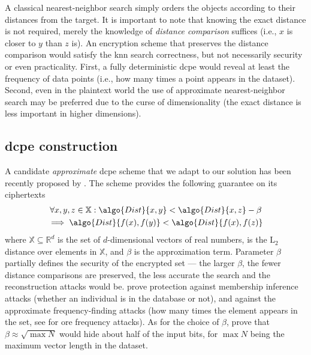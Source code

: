 		A classical nearest-neighbor search \cite{knn-wong,knn-cunningham} simply orders the objects according to their distances from the target.
		It is important to note that knowing the exact distance is not required, merely the knowledge of \emph{distance comparison} suffices (i.e., $x$ is closer to $y$ than $z$ is).
		An encryption scheme that preserves the distance comparison would satisfy the \acrshort{knn} search correctness, but not necessarily security or even practicality.
		First, a fully deterministic \acrfull{dcpe} would reveal at least the frequency of data points (i.e., how many times a point appears in the dataset).
		Second, even in the plaintext world the use of approximate nearest-neighbor search \cite{scalable-nn,approximate-nn-fixed-d} may be preferred due to the curse of dimensionality \cite{nn-meaningful,nn-curse-of-d} (the exact distance is less important in higher dimensions).

		\subsection{\texorpdfstring{\acrshort{dcpe}}{DCPE} construction}

			A candidate \emph{approximate} \acrshort{dcpe} scheme that we adapt to our solution has been recently proposed by \textcite{dcpe}.
			The scheme provides the following guarantee on its ciphertexts
			\begin{multline*}
				\forall x, y, z \in \mathbb{X} : \algo{Dist}{x, y} < \algo{Dist}{x, z} - \beta \\
				\implies \algo{Dist}{f(x), f(y)} < \algo{Dist}{f(x), f(z)}
			\end{multline*}
			where $\mathbb{X} \subseteq \mathbb{R}^d$ is the set of $d$-dimensional vectors of real numbers,  is the $\text{L}_2$ distance over elements in $\mathbb{X}$, and $\beta$ is the approximation term.
			Parameter $\beta$ partially defines the security of the encrypted set --- the larger $\beta$, the fewer distance comparisons are preserved, the less accurate the search and the reconstruction attacks would be.
			\textcite{dcpe} prove protection against membership inference attacks \cite{memebership-inference-attacks-knn} (whether an individual is in the database or not), and against the approximate frequency-finding attacks (how many times the element appears in the set, see \cite{leakage-abuse-grubs-2017} for \acrshort{ore} frequency attacks).
			As for the choice of $\beta$, \textcite{dcpe} prove that $\beta \approx \sqrt{\max N}$ would hide about half of the input bits, for $\max N$ being the maximum vector length in the dataset.

